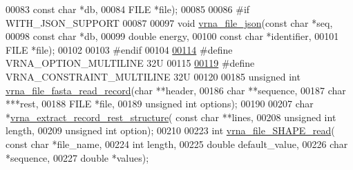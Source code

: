 \begin{DoxyCode}
00083                       \textcolor{keyword}{const} \textcolor{keywordtype}{char} *db,
00084                       FILE *file);
00085 
00086 \textcolor{preprocessor}{#if WITH\_JSON\_SUPPORT}
00087 
00097 \textcolor{keywordtype}{void} \hyperlink{file__formats_8h_a31f4a6c2ea1495a6e4f9eb45a9f6193d}{vrna\_file\_json}(\textcolor{keyword}{const} \textcolor{keywordtype}{char} *seq,
00098                     \textcolor{keyword}{const} \textcolor{keywordtype}{char} *db,
00099                     \textcolor{keywordtype}{double} energy,
00100                     \textcolor{keyword}{const} \textcolor{keywordtype}{char} *identifier,
00101                     FILE *file);
00102 
00103 \textcolor{preprocessor}{#endif}
00104 
\hypertarget{file__formats_8h_source.tex_l00114}{}\hyperlink{file__formats_8h_abec89c09874528c6cb73140a4c3d86d7}{00114} \textcolor{preprocessor}{#define VRNA\_OPTION\_MULTILINE             32U}
00115 
\hypertarget{file__formats_8h_source.tex_l00119}{}\hyperlink{file__formats_8h_a7d725ef525b29891abef3f1ed42599a4}{00119} \textcolor{preprocessor}{#define VRNA\_CONSTRAINT\_MULTILINE         32U}
00120 
00185 \textcolor{keywordtype}{unsigned} \textcolor{keywordtype}{int} \hyperlink{file__formats_8h_a8cfb7e271efc9e1f34640acb85475639}{vrna\_file\_fasta\_read\_record}(\textcolor{keywordtype}{char} **header,
00186                                     \textcolor{keywordtype}{char} **sequence,
00187                                     \textcolor{keywordtype}{char}  ***rest,
00188                                     FILE *file,
00189                                     \textcolor{keywordtype}{unsigned} \textcolor{keywordtype}{int} options);
00190 
00207 \textcolor{keywordtype}{char} *\hyperlink{file__formats_8h_ad37cbb63a05eed63ba25c91628409be0}{vrna\_extract\_record\_rest\_structure}( \textcolor{keyword}{const} \textcolor{keywordtype}{char} **lines,
00208                                           \textcolor{keywordtype}{unsigned} \textcolor{keywordtype}{int} length,
00209                                           \textcolor{keywordtype}{unsigned} \textcolor{keywordtype}{int} option);
00210 
00223 \textcolor{keywordtype}{int} \hyperlink{file__formats_8h_a646ebf45450a69a7f2533f9ecd283a32}{vrna\_file\_SHAPE\_read}( \textcolor{keyword}{const} \textcolor{keywordtype}{char} *file\_name,
00224                           \textcolor{keywordtype}{int} length,
00225                           \textcolor{keywordtype}{double} default\_value,
00226                           \textcolor{keywordtype}{char} *sequence,
00227                           \textcolor{keywordtype}{double} *values);

\end{DoxyCode}
